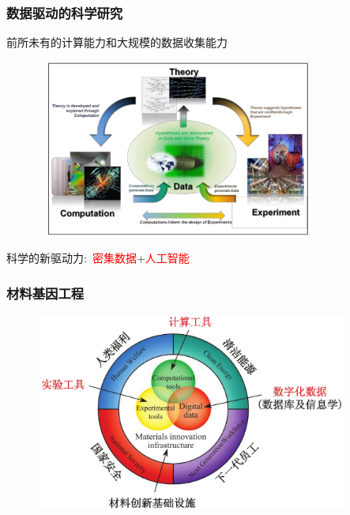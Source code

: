 \frame
{
	\frametitle{数据驱动的科学研究}
前所未有的计算能力和大规模的数据收集能力%
\begin{figure}[h!]
\centering
\includegraphics[height=2.30in,width=3.70in]{Figures/Four_Model_1.png}
\label{Four_Model_1}
\end{figure}
科学的新驱动力:~\textcolor{red}{密集数据}+\textcolor{red}{人工智能}\\
}

\frame
{
	\frametitle{材料基因工程}
\begin{figure}[h!]
\vspace*{-0.18in}
\centering
\includegraphics[height=2.55in,width=4.05in]{Figures/MGE.png}
\label{MGE}
\end{figure}
}

